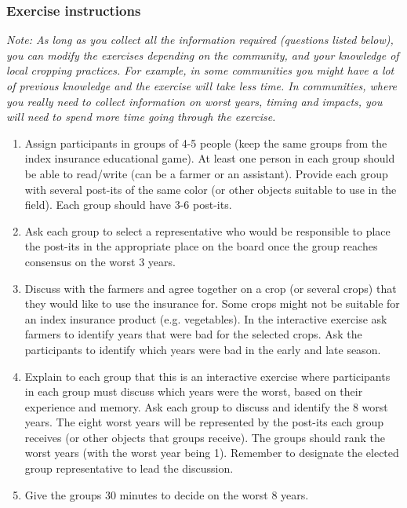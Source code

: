 \documentclass[letterpaper,10pt,english]{sphinxmanual}
\begin{document}
\subsubsection{Exercise instructions}
\label{games/initialvisitexercise_Ethiopia:exercise-instructions}
\emph{Note: As long as you collect all the information required (questions listed below), you can modify the exercises depending on the community, and your knowledge of local cropping practices. For example, in some communities you might have a lot of previous knowledge and the exercise will take less time. In communities, where you really need to collect information on worst years, timing and impacts, you will need to spend more time going through the exercise.}
\begin{enumerate}
\item {} 
Assign participants in groups of 4-5 people (keep the same groups from the index insurance educational game). At least one person in each group should be able to read/write (can be a farmer or an assistant). Provide each group with several post-its of the same color (or other objects suitable to use in the field). Each group should have 3-6 post-its.

\item {} 
Ask each group to select a representative who would be responsible to place the post-its in the appropriate place on the board once the group reaches consensus on the worst 3 years.

\item {} 
Discuss with the farmers and agree together on a crop (or several crops) that they would like to use the insurance for. Some crops might not be suitable for an index insurance product (e.g. vegetables). In the interactive exercise ask farmers to identify years that were bad for the selected crops. Ask the participants to identify which years were bad in the early and late season.

\item {} 
Explain to each group that this is an interactive exercise where participants in each group must discuss which years were the worst, based on their experience and memory. Ask each group to discuss and identify the 8 worst years. The eight worst years will be represented by the post-its each group receives (or other objects that groups receive). The groups should rank the worst years (with the worst year being 1). Remember to designate the elected group representative to lead the discussion.

\item {} 
Give the groups 30 minutes to decide on the worst 8 years.


\end{enumerate}
\end{document}
